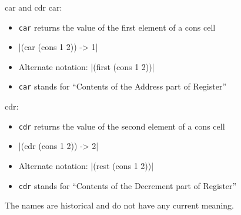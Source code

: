 \documentclass{beamer}
\begin{document}
\begin{frame}{car and cdr}
  car:
  \begin{itemize}
  \item \texttt{car} returns the value of the first element of a cons cell
  \item \cl|(car (cons 1 2)) -> 1|
  \item Alternate notation: \cl|(first (cons 1 2))|
  \item \texttt{car} stands for ``Contents of the Address part of Register''
\end{itemize}
cdr:
\begin{itemize}
  \item \texttt{cdr} returns the value of the second element of a cons cell
  \item \cl|(cdr (cons 1 2)) -> 2|
  \item Alternate notation: \cl|(rest (cons 1 2))|
  \item \texttt{cdr} stands for ``Contents of the Decrement part of Register''
\end{itemize}
The names are historical and do not have any current meaning.
\end{frame}
\end{document}
